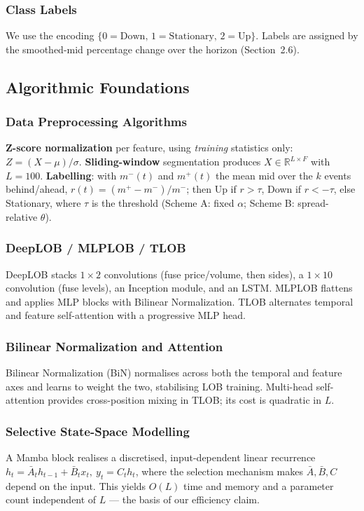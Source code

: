 \documentclass[11pt]{article}
\begin{document}
\subsubsection{Class Labels}
We use the encoding $\{0=\text{Down},\,1=\text{Stationary},\,2=\text{Up}\}$. Labels are assigned by the
smoothed-mid percentage change over the horizon (Section~2.6).

\subsection{Algorithmic Foundations}
\subsubsection{Data Preprocessing Algorithms}
\textbf{Z-score normalization} per feature, using \emph{training} statistics only:
$Z = (X-\mu)/\sigma$.
\textbf{Sliding-window} segmentation produces $X\in\mathbb{R}^{L\times F}$ with $L=100$.
\textbf{Labelling}: with $m^-(t)$ and $m^+(t)$ the mean mid over the $k$ events behind/ahead,
$r(t) = (m^+ - m^-)/m^-$; then Up if $r>\tau$, Down if $r<-\tau$, else Stationary, where $\tau$ is the
threshold (Scheme A: fixed $\alpha$; Scheme B: spread-relative $\theta$).

\subsubsection{DeepLOB / MLPLOB / TLOB}
DeepLOB stacks $1\times2$ convolutions (fuse price/volume, then sides), a $1\times10$ convolution (fuse
levels), an Inception module, and an LSTM. MLPLOB flattens and applies MLP blocks with Bilinear
Normalization. TLOB alternates temporal and feature self-attention with a progressive MLP head.

\subsubsection{Bilinear Normalization and Attention}
Bilinear Normalization (BiN) normalises across both the temporal and feature axes and learns to weight the
two, stabilising LOB training. Multi-head self-attention provides cross-position mixing in TLOB; its cost
is quadratic in $L$.

\subsubsection{Selective State-Space Modelling}
A Mamba block realises a discretised, input-dependent linear recurrence
$h_t = \bar{A}_t h_{t-1} + \bar{B}_t x_t,\ y_t = C_t h_t$, where the selection mechanism makes
$\bar A,\bar B,C$ depend on the input. This yields $O(L)$ time and memory and a parameter count independent
of $L$ --- the basis of our efficiency claim.
\end{document}
